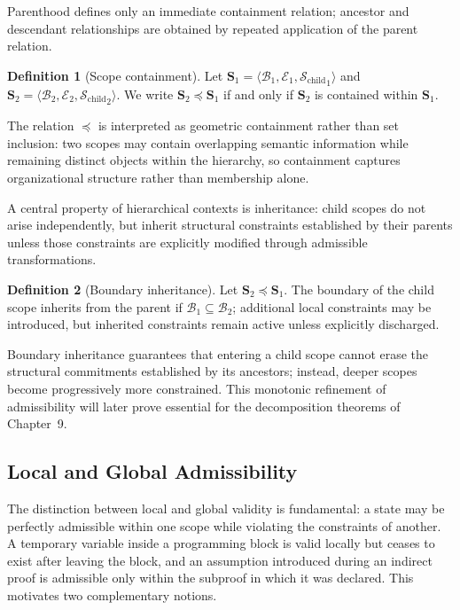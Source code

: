\documentclass[11pt,twoside,openright]{book}
\numberwithin{equation}{chapter}
\theoremstyle{definition}
\newtheorem{definition}{Definition}[chapter]
\theoremstyle{plain}
\theoremstyle{remark}
\theoremstyle{definition}
\newcommand{\Scope}{\mathbf{S}}
\newcommand{\Boundary}{\mathcal{B}}
\newcommand{\Interior}{\mathcal{E}}
\newcommand{\Children}{\mathcal{S}_{\mathrm{child}}}
\begin{document}
Parenthood defines only an immediate containment relation; ancestor and
descendant relationships are obtained by repeated application of the
parent relation.

\begin{definition}[Scope containment]
Let $\Scope_1=\langle\Boundary_1,\Interior_1,{\Children}_1\rangle$ and
$\Scope_2=\langle\Boundary_2,\Interior_2,{\Children}_2\rangle$. We write
$\Scope_2\preceq\Scope_1$ if and only if $\Scope_2$ is contained within
$\Scope_1$.
\end{definition}

The relation $\preceq$ is interpreted as geometric containment rather than
set inclusion: two scopes may contain overlapping semantic information
while remaining distinct objects within the hierarchy, so containment
captures organizational structure rather than membership alone.

A central property of hierarchical contexts is inheritance: child scopes
do not arise independently, but inherit structural constraints
established by their parents unless those constraints are explicitly
modified through admissible transformations.

\begin{definition}[Boundary inheritance]
Let $\Scope_2\preceq\Scope_1$. The boundary of the child scope inherits from
the parent if $\Boundary_1\subseteq\Boundary_2$; additional local
constraints may be introduced, but inherited constraints remain active
unless explicitly discharged.
\end{definition}

Boundary inheritance guarantees that entering a child scope cannot erase
the structural commitments established by its ancestors; instead, deeper
scopes become progressively more constrained. This monotonic refinement
of admissibility will later prove essential for the decomposition
theorems of Chapter~9.

\subsection{Local and Global Admissibility}

The distinction between local and global validity is fundamental: a state
may be perfectly admissible within one scope while violating the
constraints of another. A temporary variable inside a programming block is
valid locally but ceases to exist after leaving the block, and an
assumption introduced during an indirect proof is admissible only within
the subproof in which it was declared. This motivates two complementary
notions.
\end{document}
